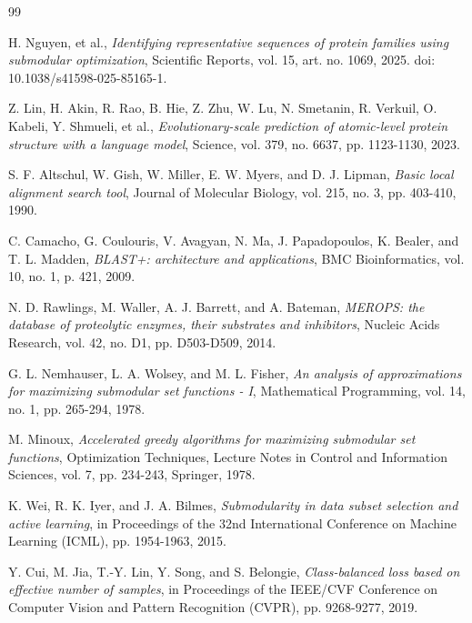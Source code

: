\clearpage
{}
{}

\begingroup
{}
\begin{thebibliography}{99}
\raggedright
\setlength{\itemsep}{1pt}
\setlength{\parskip}{0pt}

H. Nguyen, et al.,
\textit{Identifying representative sequences of protein families using submodular optimization},
Scientific Reports, vol. 15, art. no. 1069, 2025. doi: 10.1038/s41598-025-85165-1.

Z. Lin, H. Akin, R. Rao, B. Hie, Z. Zhu, W. Lu, N. Smetanin, R. Verkuil, O. Kabeli, Y. Shmueli, et al.,
\textit{Evolutionary-scale prediction of atomic-level protein structure with a language model},
Science, vol. 379, no. 6637, pp. 1123-1130, 2023.

S. F. Altschul, W. Gish, W. Miller, E. W. Myers, and D. J. Lipman,
\textit{Basic local alignment search tool},
Journal of Molecular Biology, vol. 215, no. 3, pp. 403-410, 1990.

C. Camacho, G. Coulouris, V. Avagyan, N. Ma, J. Papadopoulos, K. Bealer, and T. L. Madden,
\textit{BLAST+: architecture and applications},
BMC Bioinformatics, vol. 10, no. 1, p. 421, 2009.

N. D. Rawlings, M. Waller, A. J. Barrett, and A. Bateman,
\textit{MEROPS: the database of proteolytic enzymes, their substrates and inhibitors},
Nucleic Acids Research, vol. 42, no. D1, pp. D503-D509, 2014.

G. L. Nemhauser, L. A. Wolsey, and M. L. Fisher,
\textit{An analysis of approximations for maximizing submodular set functions - I},
Mathematical Programming, vol. 14, no. 1, pp. 265-294, 1978.

M. Minoux,
\textit{Accelerated greedy algorithms for maximizing submodular set functions},
Optimization Techniques, Lecture Notes in Control and Information Sciences, vol. 7, pp. 234-243, Springer, 1978.

K. Wei, R. K. Iyer, and J. A. Bilmes,
\textit{Submodularity in data subset selection and active learning},
in Proceedings of the 32nd International Conference on Machine Learning (ICML), pp. 1954-1963, 2015.

Y. Cui, M. Jia, T.-Y. Lin, Y. Song, and S. Belongie,
\textit{Class-balanced loss based on effective number of samples},
in Proceedings of the IEEE/CVF Conference on Computer Vision and Pattern Recognition (CVPR), pp. 9268-9277, 2019.


\end{thebibliography}

